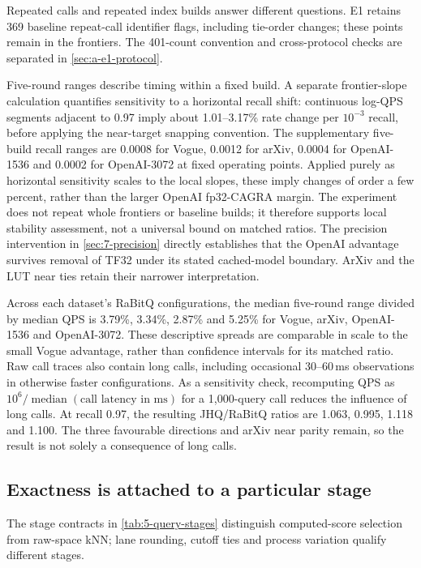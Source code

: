 Repeated calls and repeated index builds answer different questions.
E1 retains 369 baseline repeat-call identifier flags, including tie-order
changes; these points remain in the frontiers. The 401-count convention
and cross-protocol checks are separated in \cref{sec:a-e1-protocol}.

Five-round ranges describe timing within a fixed build. A separate
frontier-slope calculation quantifies sensitivity to a horizontal recall
shift: continuous log-QPS segments adjacent to 0.97 imply about
1.01--3.17\% rate change per $10^{-3}$ recall, before applying the
near-target snapping convention. The supplementary five-build recall ranges are 0.0008 for Vogue,
0.0012 for arXiv, 0.0004 for OpenAI-1536 and 0.0002 for OpenAI-3072
at fixed operating points. Applied purely as horizontal sensitivity
scales to the local slopes, these imply changes of order a few percent,
rather than the larger OpenAI fp32-CAGRA margin. The experiment does
not repeat whole frontiers or baseline builds; it therefore supports
local stability assessment, not a universal bound on matched ratios.
The precision intervention in \cref{sec:7-precision} directly establishes
that the OpenAI advantage survives removal of TF32 under its stated
cached-model boundary. ArXiv and the LUT near ties retain their narrower
interpretation.

Across each dataset's RaBitQ configurations, the median five-round
range divided by median QPS is 3.79\%, 3.34\%, 2.87\% and 5.25\%
for Vogue, arXiv, OpenAI-1536 and OpenAI-3072. These descriptive spreads
are comparable in scale to the small Vogue advantage, rather than
confidence intervals for its matched ratio. Raw call traces also contain
long calls, including occasional 30--60\,ms observations in otherwise
faster configurations. As a sensitivity check, recomputing QPS as
$10^6/\operatorname{median}(\text{call latency in ms})$ for a
1,000-query call reduces the influence of long calls.
At recall 0.97, the resulting JHQ/RaBitQ ratios are 1.063, 0.995,
1.118 and 1.100. The three favourable directions and arXiv near parity
remain, so the result is not solely a consequence of long calls.

\subsection{Exactness is attached to a particular stage}
\label{sec:7-recall-attribution}

The stage contracts in \cref{tab:5-query-stages} distinguish computed-score
selection from raw-space kNN; lane rounding, cutoff ties and process
variation qualify different stages.



